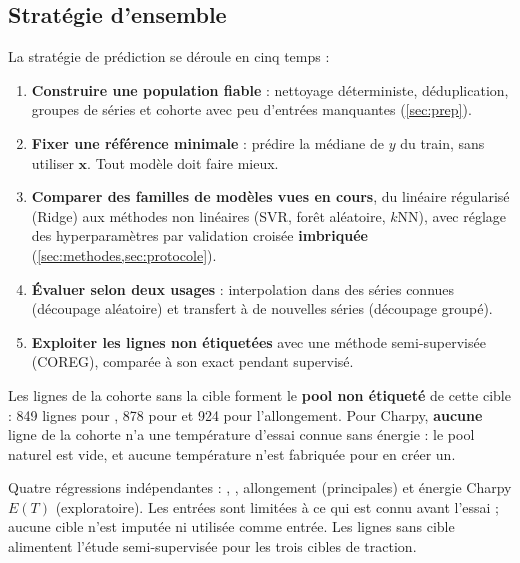 \subsection{Stratégie d'ensemble}

La stratégie de prédiction se déroule en cinq temps :
\begin{enumerate}
  \item \textbf{Construire une population fiable} : nettoyage déterministe, déduplication, groupes de séries et cohorte avec peu d'entrées manquantes (\cref{sec:prep}).
  \item \textbf{Fixer une référence minimale} : prédire la médiane de $y$ du train, sans utiliser $\bm{x}$. Tout modèle doit faire mieux.
  \item \textbf{Comparer des familles de modèles vues en cours}, du linéaire régularisé (Ridge) aux méthodes non linéaires (SVR, forêt aléatoire, $k$NN), avec réglage des hyperparamètres par validation croisée \textbf{imbriquée} (\cref{sec:methodes,sec:protocole}).
  \item \textbf{Évaluer selon deux usages} : interpolation dans des séries connues (découpage aléatoire) et transfert à de nouvelles séries (découpage groupé).
  \item \textbf{Exploiter les lignes non étiquetées} avec une méthode semi-supervisée (COREG), comparée à son exact pendant supervisé.
\end{enumerate}

Les lignes de la cohorte sans la cible forment le \textbf{pool non étiqueté} de
cette cible : 849 lignes pour \YS, 878 pour \UTS{} et 924 pour l'allongement.
Pour Charpy, \textbf{aucune} ligne de la cohorte n'a une température d'essai
connue sans énergie : le pool naturel est vide, et aucune température n'est
fabriquée pour en créer un.

\begin{aretenir}
Quatre régressions indépendantes : \YS, \UTS, allongement (principales) et
énergie Charpy $E(T)$ (exploratoire). Les entrées sont limitées à ce qui est
connu avant l'essai ; aucune cible n'est imputée ni utilisée comme entrée. Les
lignes sans cible alimentent l'étude semi-supervisée pour les trois cibles de
traction.
\end{aretenir}
